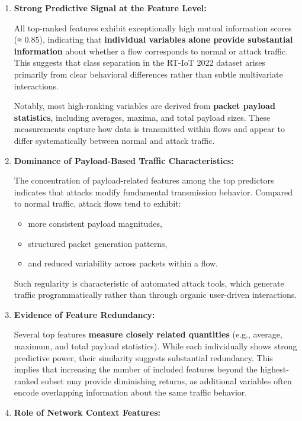 \documentclass[
  letterpaper,
  DIV=11,
  numbers=noendperiod]{scrartcl}
\providecommand{\tightlist}{%
  \setlength{\itemsep}{0pt}\setlength{\parskip}{0pt}}
\begin{document}
\begin{enumerate}
\def\labelenumi{\arabic{enumi}.}
\item
  \textbf{Strong Predictive Signal at the Feature Level:}

  All top-ranked features exhibit exceptionally high mutual information
  scores (≈ 0.85), indicating that \textbf{individual variables alone
  provide substantial information} about whether a flow corresponds to
  normal or attack traffic. This suggests that class separation in the
  RT-IoT 2022 dataset arises primarily from clear behavioral differences
  rather than subtle multivariate interactions.

  Notably, most high-ranking variables are derived from \textbf{packet
  payload statistics}, including averages, maxima, and total payload
  sizes. These measurements capture how data is transmitted within flows
  and appear to differ systematically between normal and attack traffic.
\item
  \textbf{Dominance of Payload-Based Traffic Characteristics:}

  The concentration of payload-related features among the top predictors
  indicates that attacks modify fundamental transmission behavior.
  Compared to normal traffic, attack flows tend to exhibit:

  \begin{itemize}
  \tightlist
  \item
    more consistent payload magnitudes,
  \item
    structured packet generation patterns,
  \item
    and reduced variability across packets within a flow.
  \end{itemize}

  Such regularity is characteristic of automated attack tools, which
  generate traffic programmatically rather than through organic
  user-driven interactions.
\item
  \textbf{Evidence of Feature Redundancy:}

  Several top features \textbf{measure closely related quantities}
  (e.g., average, maximum, and total payload statistics). While each
  individually shows strong predictive power, their similarity suggests
  substantial redundancy. This implies that increasing the number of
  included features beyond the highest-ranked subset may provide
  diminishing returns, as additional variables often encode overlapping
  information about the same traffic behavior.
\item
  \textbf{Role of Network Context Features:}


\end{enumerate}
\end{document}
